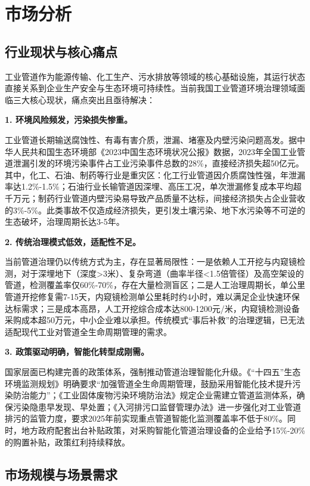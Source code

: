 \documentclass[12pt, a4paper]{article}
\let\oldsection\section
\renewcommand{\section}{\FloatBarrier\oldsection}
\begin{document}
\section{市场分析}

\subsection{行业现状与核心痛点}

工业管道作为能源传输、化工生产、污水排放等领域的核心基础设施，其运行状态直接关系到企业生产安全与生态环境可持续性。当前我国工业管道环境治理领域面临三大核心现状，痛点突出且亟待解决：



\textbf{1. 环境风险频发，污染损失惨重。}

工业管道长期输送腐蚀性、有毒有害介质，泄漏、堵塞及内壁污染问题高发。据中华人民共和国生态环境部《2023中国生态环境状况公报》数据，2023年全国工业管道泄漏引发的环境污染事件占工业污染事件总数的28\%，直接经济损失超50亿元。其中，化工、石油、制药等行业是重灾区：化工行业管道因介质腐蚀性强，年泄漏率达1.2\%-1.5\%；石油行业长输管道因深埋、高压工况，单次泄漏修复成本平均超千万元；制药行业管道内壁污染易导致产品质量不达标，间接经济损失占企业营收的3\%-5\%。此类事故不仅造成经济损失，更引发土壤污染、地下水污染等不可逆的生态破坏，治理周期长达3-5年。

\textbf{2. 传统治理模式低效，适配性不足。}

当前管道治理仍以传统方式为主，存在显著局限性：一是依赖人工开挖与内窥镜检测，对于深埋地下（深度>3米）、复杂弯道（曲率半径<1.5倍管径）及高空架设的管道，检测覆盖率仅60\%-70\%，存在大量检测盲区；二是人工治理周期长，单公里管道开挖修复需7-15天，内窥镜检测单公里耗时约4小时，难以满足企业快速环保达标需求；三是成本高昂，人工开挖综合成本达800-1200元/米，内窥镜检测设备采购成本超50万元，中小企业难以承担。传统模式“事后补救”的治理逻辑，已无法适配现代工业对管道全生命周期管理的需求。

\textbf{3. 政策驱动明确，智能化转型成刚需。}

国家层面已构建完善的政策体系，强制推动管道治理智能化升级。《“十四五”生态环境监测规划》明确要求“加强管道全生命周期管理，鼓励采用智能化技术提升污染防治能力”；《工业固体废物污染环境防治法》规定企业需建立管道监测体系，确保污染隐患早发现、早处置；《入河排污口监督管理办法》进一步强化对工业管道排污的监管力度，要求2025年前实现重点管道智能化监测覆盖率不低于80\%。同时，地方政府配套出台补贴政策，对采购智能化管道治理设备的企业给予15\%-20\%的购置补贴，政策红利持续释放。

\subsection{市场规模与场景需求}
\end{document}
